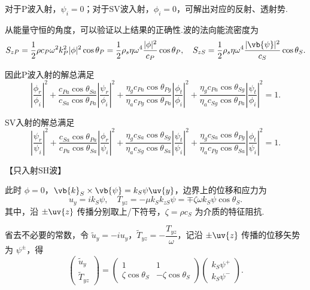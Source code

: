对于P波入射，\(\psi_i = 0\)；对于SV波入射，\(\phi_i = 0\)，可解出对应的反射、透射势.

从能量守恒的角度，可以验证以上结果的正确性.波的法向能流密度为
\begin{equation*}
	S_{zP} = \dfrac{1}{2} \rho c_P \omega^2 k_P^2 |\phi|^2 \cos\theta_P = \dfrac{1}{2} \rho_s \eta \omega^4 \dfrac{|\phi|^2}{c_P} \cos\theta_P, \quad S_{zS} = \dfrac{1}{2} \rho_s \eta \omega^4 \dfrac{|\vb{\psi}|^2}{c_S} \cos\theta_S.
\end{equation*}

因此P波入射的解总满足
\begin{equation*}
	\left| \dfrac{\phi_r}{\phi_i} \right|^2 + \dfrac{c_{Pa} \cos\theta_{Sa}}{c_{Sa} \cos\theta_{Pa}} \left| \dfrac{\psi_r}{\phi_i} \right|^2 + \dfrac{\eta_g c_{Pa} \cos\theta_{Pg}}{\eta_a c_{Pg} \cos\theta_{Pa}} \left| \dfrac{\phi_t}{\phi_i} \right|^2 + \dfrac{\eta_g c_{Pa} \cos\theta_{Sg}}{\eta_a c_{Sg} \cos\theta_{Pa}} \left| \dfrac{\psi_t}{\phi_i} \right|^2 = 1.
\end{equation*}

SV入射的解总满足
\begin{equation*}
	\left| \dfrac{\psi_r}{\psi_i} \right|^2 + \dfrac{c_{Sa} \cos\theta_{Pa}}{c_{Pa} \cos\theta_{Sa}} \left| \dfrac{\phi_r}{\psi_i} \right|^2 + \dfrac{\eta_g c_{Sa} \cos\theta_{Sg}}{\eta_a c_{Sg} \cos\theta_{Sa}} \left| \dfrac{\psi_t}{\psi_i} \right|^2 + \dfrac{\eta_g c_{Sa} \cos\theta_{Pg}}{\eta_a c_{Pg} \cos\theta_{Sa}} \left| \dfrac{\phi_t}{\psi_i} \right|^2 = 1.
\end{equation*}


【只入射SH波】

此时 \(\phi = 0\)，\(\vb{k}_S \times \vb{\psi} = k_S \psi \uv{y}\)，边界上的位移和应力为
\begin{equation*}
	u_y = i k_S \psi, \quad T_{yz} = -\mu k_S k_{zS} \psi = \mp \zeta \omega k_S \psi \cos\theta_S.
\end{equation*}
其中，沿 \(\pm \uv{z}\) 传播分别取上/下符号，\(\zeta = \rho c_S\) 为介质的特征阻抗.

省去不必要的常数，令 \(\tilde{u}_y = -i u_y\)，\(\tilde{T}_{yz} = -\dfrac{T_{yz}}{\omega}\)，记沿 \(\pm \uv{z}\) 传播的位移矢势为 \(\psi^\pm\)，得
\begin{equation*}
	\begin{pmatrix} \tilde{u}_y \\ \tilde{T}_{yz} \end{pmatrix} =
	\begin{pmatrix} 1 & 1 \\ \zeta \cos\theta_S & -\zeta \cos\theta_S \end{pmatrix}
	\begin{pmatrix} k_S \psi^+ \\ k_S \psi^- \end{pmatrix}.
\end{equation*}


